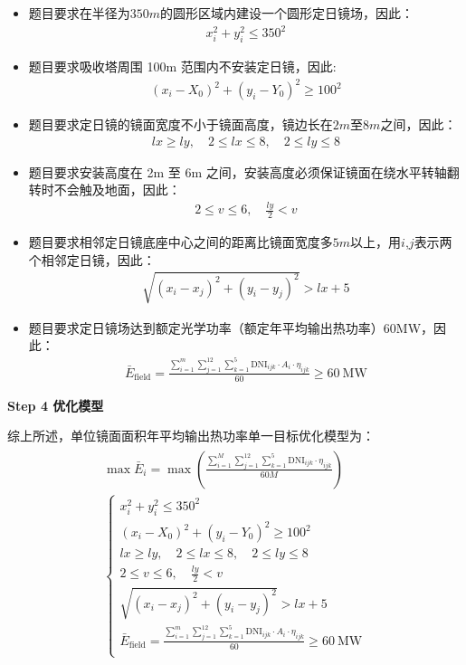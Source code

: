 \documentclass[../main.tex]{subfiles}
\begin{document}
\begin{itemize}
    \item 题目要求在半径为$350m$的圆形区域内建设一个圆形定日镜场，因此：
  \begin{align}\label{2.3}
x_i^2 + y_i^2 \leq 350^2
  \end{align}
    \item 题目要求吸收塔周围 100m 范围内不安装定日镜，因此:
      \begin{align}\label{2.4}
(x_i - X_0)^2 + (y_i - Y_0)^2 \geq 100^2
  \end{align}
    \item 题目要求定日镜的镜面宽度不小于镜面高度，镜边长在$2m$至$8m$之间，因此：
      \begin{align}\label{2.5}
lx \geq ly, \quad 2 \leq lx \leq 8, \quad 2 \leq ly \leq 8
  \end{align}
    \item 题目要求安装高度在 2m 至 6m 之间，安装高度必须保证镜面在绕水平转轴翻转时不会触及地面，因此：     
     \begin{align}\label{2.6}
2 \leq v \leq 6, \quad \frac{ly}{2} < v
  \end{align}
    \item 题目要求相邻定日镜底座中心之间的距离比镜面宽度多$5m$以上，用$i$,$j$表示两个相邻定日镜，因此：     
      \begin{align}\label{2.7}
\sqrt{(x_i - x_j)^2 + (y_i - y_j)^2} > lx + 5
  \end{align}
\item 题目要求定日镜场达到额定光学功率（额定年平均输出热功率）60MW，因此：       
 \begin{align}\label{2.8}
\bar{E}_{\text{field}} = \frac{\sum_{i=1}^{m} \sum_{j=1}^{12} \sum_{k=1}^{5} \text{DNI}_{ijk} \cdot A_i \cdot \eta_{ijk}}{60} \geq 60\ \text{MW}
  \end{align}
 
\end{itemize}
\noindent \textbf{Step 4 优化模型}
\par 综上所述，单位镜面面积年平均输出热功率单一目标优化模型为：
  \begin{align}\label{2.9}
\begin{array}{c}
	\max \bar{E}_i = \max\left( \frac{\sum_{i=1}^{M} \sum_{j=1}^{12} \sum_{k=1}^{5} \text{DNI}_{ijk} \cdot \eta_{ijk}}{60M} \right)
\\
	\left\{ \begin{array}{l}
    x_i^2 + y_i^2 \leq 350^2\\
	(x_i - X_0)^2 + (y_i - Y_0)^2 \geq 100^2\\
	lx \geq ly, \quad 2 \leq lx \leq 8, \quad 2 \leq ly \leq 8\\
	2 \leq v \leq 6, \quad \frac{ly}{2} < v\\
	\sqrt{(x_i - x_j)^2 + (y_i - y_j)^2} > lx + 5\\
	\bar{E}_{\text{field}} = \frac{\sum_{i=1}^{m} \sum_{j=1}^{12} \sum_{k=1}^{5} \text{DNI}_{ijk} \cdot A_i \cdot \eta_{ijk}}{60} \geq 60\ \text{MW}\\
\end{array} \right.\\
\end{array}
  \end{align}
\end{document}
